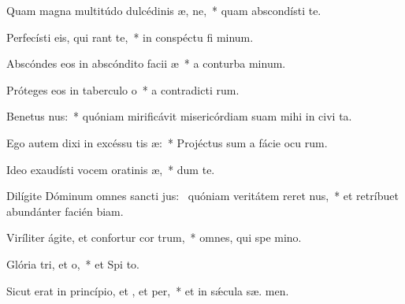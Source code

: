 \item Quam magna multitúdo dulcédinis æ, ne,~* quam abscondísti  te.
\item Perfecísti eis, qui rant  te,~* in conspéctu fi minum.
\item Abscóndes eos in abscóndito facii æ~* a conturba minum.
\item Próteges eos in taberculo o~* a contradicti rum.
\item Benetus nus:~* quóniam mirificávit misericórdiam suam mihi in civi ta.
\item Ego autem dixi in excéssu tis æ:~* Projéctus sum a fácie ocu rum.
\item Ideo exaudísti vocem oratinis æ,~* dum   te.
\item Dilígite Dóminum omnes sancti jus:~\pscross{} quóniam veritátem reret nus,~* et retríbuet abundánter facién biam.
\item Viríliter ágite, et confortur cor trum,~* omnes, qui spe  mino.
\item Glória tri, et o,~* et Spi to.
\item Sicut erat in princípio, et , et per,~* et in sǽcula sæ. men.
